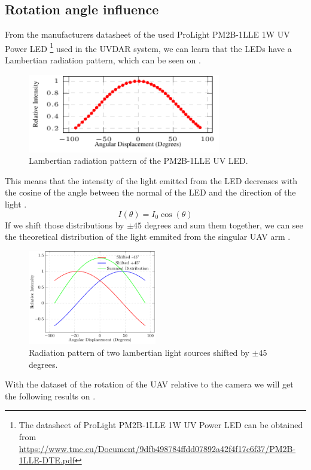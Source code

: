 \subsection{Rotation angle influence}
From the manufacturers datasheet of the used ProLight PM2B-1LLE 1W \ac{UV} Power \ac{LED} \footnote{The datasheet of ProLight PM2B-1LLE 1W UV Power LED can be obtained from \url{https://www.tme.eu/Document/9dfb498784ffdd07892a42f4f17c6f37/PM2B-1LLE-DTE.pdf}}
used in the UVDAR system, we can learn that the \ac{LED}s have a Lambertian radiation pattern,
which can be seen on .
\begin {figure}[H]
	\centering
	\includegraphics[width=0.75\textwidth]{./fig/semestral/lambertian/lambertian.pdf}
	\caption{Lambertian radiation pattern of the PM2B-1LLE UV LED.}
	\label{fig:lambertian}
\end{figure}
This means that the intensity of the light emitted from the LED decreases with the cosine
of the angle between the normal of the LED and the direction of the light .
\begin{equation}
	I(\theta) = I_0\cos(\theta)
	\label{eq:lambertian}
\end{equation}
If we shift those distributions by $\pm 45$ degrees and sum them together, we can see the
theoretical distribution of the light emmited from the singular UAV arm .
\begin {figure}[H]
	\centering
	\includegraphics[width=0.50\textwidth]{./fig/semestral/lambertian/3lambertian.pdf}
	\caption{Radiation pattern of two lambertian light sources shifted by $\pm 45$ degrees.}
	\label{fig:lambert_combined}
\end{figure}
With the dataset of the rotation of the UAV relative to the camera we will get the following results
on .

